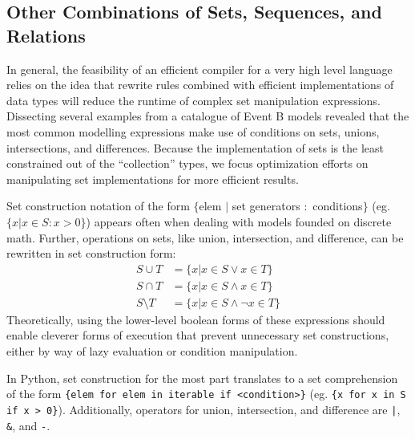 \documentclass{article}
\begin{document}
\subsection{Other Combinations of Sets, Sequences, and Relations}

In general, the feasibility of an efficient compiler for a very high level language relies on the idea that rewrite rules combined with efficient implementations of data types will reduce the runtime of complex set manipulation expressions. Dissecting several examples from a catalogue of Event B models revealed that the most common modelling expressions make use of conditions on sets, unions, intersections, and differences. Because the implementation of sets is the least constrained out of the ``collection'' types, we focus optimization efforts on manipulating set implementations for more efficient results.

Set construction notation of the form $\{$elem $|$ set generators $:$ conditions$\}$ (eg. $\{x | x \in S : x > 0\}$) appears often when dealing with models founded on discrete math. Further, operations on sets, like union, intersection, and difference, can be rewritten in set construction form:
\begin{align*}
  S \cup T &= \{x | x \in S \lor x \in T\}\\
  S \cap T &= \{x | x \in S \land x \in T\}\\
  S \setminus T &= \{x | x \in S \land \lnot x \in T\}
\end{align*}
Theoretically, using the lower-level boolean forms of these expressions should enable cleverer forms of execution that prevent unnecessary set constructions, either by way of lazy evaluation or condition manipulation.

In Python, set construction for the most part translates to a set comprehension of the form \texttt{\{elem for elem in iterable if <condition>\}} (eg. \texttt{\{x for x in S if x > 0\}}). Additionally, operators for union, intersection, and difference are \texttt{|}, \texttt{\&}, and \texttt{-}.
\end{document}
